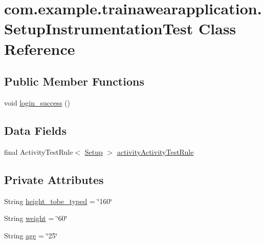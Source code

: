 \hypertarget{classcom_1_1example_1_1trainawearapplication_1_1_setup_instrumentation_test}{}\section{com.\+example.\+trainawearapplication.\+Setup\+Instrumentation\+Test Class Reference}
\label{classcom_1_1example_1_1trainawearapplication_1_1_setup_instrumentation_test}
\subsection*{Public Member Functions}
\begin{DoxyCompactItemize}
\item 
void \mbox{\hyperlink{classcom_1_1example_1_1trainawearapplication_1_1_setup_instrumentation_test_a4dbc2cfc0d101616f6c60f075bc55d58}{login\+\_\+success}} ()
\end{DoxyCompactItemize}
\subsection*{Data Fields}
\begin{DoxyCompactItemize}
\item 
final Activity\+Test\+Rule$<$ \mbox{\hyperlink{classcom_1_1example_1_1trainawearapplication_1_1_setup}{Setup}} $>$ \mbox{\hyperlink{classcom_1_1example_1_1trainawearapplication_1_1_setup_instrumentation_test_ac9f8d1c61d6707efca17625aa2c3ca28}{activity\+Activity\+Test\+Rule}}
\end{DoxyCompactItemize}
\subsection*{Private Attributes}
\begin{DoxyCompactItemize}
\item 
String \mbox{\hyperlink{classcom_1_1example_1_1trainawearapplication_1_1_setup_instrumentation_test_a969cc5898cf6bdc58207c1944f573a78}{height\+\_\+tobe\+\_\+typed}} = \char`\"{}160\char`\"{}
\item 
String \mbox{\hyperlink{classcom_1_1example_1_1trainawearapplication_1_1_setup_instrumentation_test_a09706ee1f2c90e4a5ea3edb460714adb}{weight}} = \char`\"{}60\char`\"{}
\item 
String \mbox{\hyperlink{classcom_1_1example_1_1trainawearapplication_1_1_setup_instrumentation_test_a8c73f8c3f826243e4d875a7e5a9898ff}{age}} = \char`\"{}25\char`\"{}
\end{DoxyCompactItemize}


